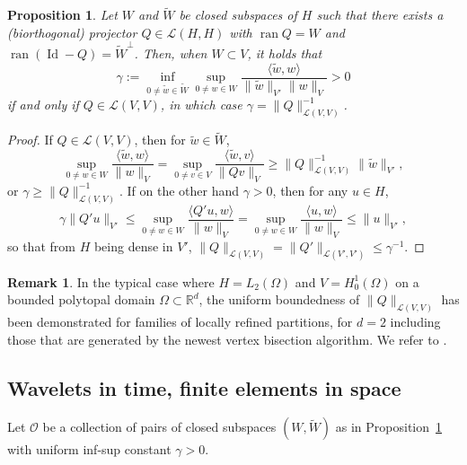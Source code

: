 \documentclass[11pt,a4paper,oneside,english]{amsart}
\numberwithin{equation}{section}
\numberwithin{theorem}{section}
\newtheorem{prop}[theorem]{Proposition}
\theoremstyle{definition}
\newtheorem{remark}[theorem]{Remark}
\newcommand{\R}{\mathbb{R}}
\newcommand{\la}{\langle}
\newcommand{\ra}{\rangle}
\DeclareMathOperator*{\Id}{Id}
\newcommand{\cL}{\mathcal L}
\newcommand{\jw}[1]{{\color{red}{JW: #1}}}
\DeclareMathOperator*{\ran}{ran}
\begin{document}
\begin{prop} \label{prop:space-infsup}
  Let $W$ and $\tilde W$ be closed subspaces of $H$ such that there exists a
  (biorthogonal) projector $Q \in \cL(H,H)$ with $\ran Q=W$ and $\ran (\Id -Q)={\tilde W}^\perp$.
  Then, when $W \subset V$, it holds that
  \[
    \gamma:=\inf_{0 \neq \tilde w \in \tilde W}\sup_{0 \neq w \in W}\frac{\la \tilde w,w\ra}{\|\tilde w\|_{V'}\|w\|_V}>0
  \]
  if and only if $Q \in \cL(V,V)$, in which case $\gamma=\|Q\|_{\cL(V,V)}^{-1}$.
\end{prop}
\begin{proof} \jw{Dit ben ik nog niet nagegaan.} If $Q\in \cL(V,V)$, then for $\tilde w \in \tilde W$,
$$
\sup_{0 \neq w \in W}\frac{\la \tilde w,w\ra}{\|w\|_V}=\sup_{0 \neq v \in V}\frac{\la \tilde w, v\ra}{\|Qv\|_V}
\geq \|Q\|_{\cL(V,V)}^{-1} \|\tilde w\|_{V'},
$$
or $\gamma \geq \|Q\|_{\cL(V,V)}^{-1}$. If on the other hand $\gamma>0$, then for any $u \in H$,
$$
\gamma \|Q' u\|_{V'} \leq \sup_{0 \neq w \in W}\frac{\la Q'u,w\ra}{\|w\|_V} =
 \sup_{0 \neq w \in W}\frac{\la u,w\ra}{\|w\|_V} \leq \|u\|_{V'},
 $$
so that from $H$ being dense in $V'$, $\|Q\|_{\cL(V,V)}=\|Q'\|_{\cL(V',V')}\leq \gamma^{-1}$.
\end{proof}
\begin{remark}
  In the typical case where $H = L_2(\Omega)$ and $V = H_0^1(\Omega)$ on a bounded
  polytopal domain $\Omega \subset \R^d$, the uniform boundedness of $\|Q\|_{\cL(V,V)}$
  has been demonstrated for families of locally refined partitions, for $d=2$
  including those that are generated by the newest vertex bisection algorithm.
  We refer to \cite{Carstensen2001a,Gaspoz2016}. \jw{Misschien is het ``$H^1$-stability
  of $L^2$-projection" inmiddels wel uitgespeeld. ik vond ook een werk uit
  2014 van de groep van Dirk, en dit werkte voor elke dimensie, maar enkel op
  vreemde fin.elts. Ook een werk uit 2019 van Gaspoz, Heine, Siebert waar het
  2d-NVB geval wordt bekeken voor Lagrange-fin elts tot graad 4.}
\end{remark}

\subsection{Wavelets in time, finite elements in space}
\jw{Willen we hier $\tilde Y^\delta$ houden ookal is hij gewoon $=Y^\delta$?}
Let ${\mathcal O}$ be a collection of pairs of closed subspaces $(W,\tilde{W})$
as in Proposition~\ref{prop:space-infsup} with uniform inf-sup constant $\gamma>0$.
\end{document}
